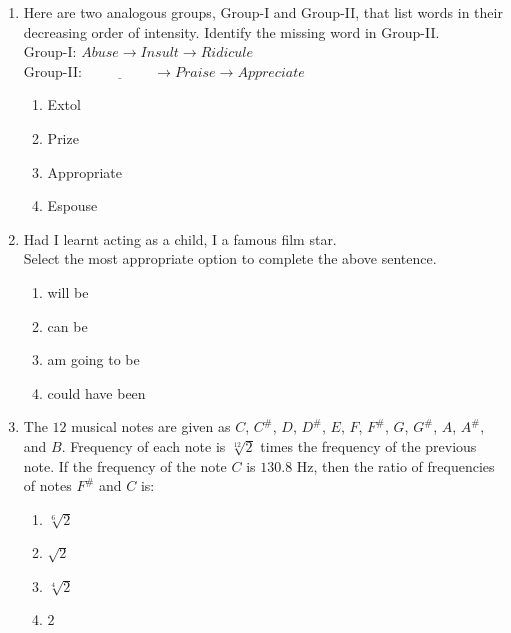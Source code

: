 \documentclass[journal]{IEEEtran}
\begin{document}
\begin{enumerate}
    \item Here are two analogous groups, Group-I and Group-II, that list words in their decreasing order of intensity.
Identify the missing word in Group-II.
    \\
    Group-I: $Abuse \rightarrow Insult \rightarrow Ridicule$
    \\
    Group-II: $\underline{\hspace{2cm}} \rightarrow Praise \rightarrow Appreciate$
    \begin{multicols}{2}       
    \begin{enumerate}
        \item Extol
        \item Prize
        \item Appropriate
        \item Espouse
    \end{enumerate}
    \end{multicols}

    \item Had I learnt acting as a child, I 
\underline{\hspace{3cm}} a famous film star.
    \\
    Select the most appropriate option to complete the above sentence.
\begin{multicols}{2}
    \begin{enumerate}
        \item will be
        \item can be
        \item am going to be
        \item could have been
    \end{enumerate}
    \end{multicols}
    
    \item The $12$ musical notes are given as $C$, $C^{\#}$, $D$, $D^{\#}$, $E$, $F$, $F^{\#}$, $G$, $G^{\#}$, $A$, $A^{\#}$, and $B$.
Frequency of each note is $\sqrt[12]{2}$ times the frequency of the previous note.
If the frequency of the note $C$ is $130.8$ Hz, then the ratio of frequencies of notes $F^{\#}$ and $C$ is:
    \begin{multicols}{2}
    \begin{enumerate}
        \item $\sqrt[6]{2}$
        \item $\sqrt{2}$
        \item $\sqrt[4]{2}$
        \item $2$
    \end{enumerate}
    \end{multicols}


\end{enumerate}
\end{document}

